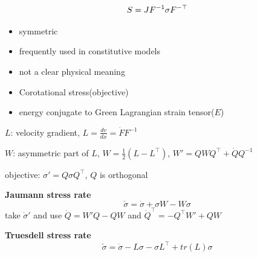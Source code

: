 \documentclass[landscape,a0paper,fontscale=0.285]{baposter} %
\newcommand{\compresslist}{ %
\setlength{\itemsep}{1pt}
\setlength{\parskip}{0pt}
\setlength{\parsep}{0pt}
}
\begin{document}
\begin{poster}
{\colorbox[HTML]{CCFFFF}{}\vspace{-0.3cm}
$$\vspace{-0.3cm}
S = JF^{-1}\sigma F^{-\top} 
$$

\begin{itemize} \compresslist
    \item symmetric
    \item frequently used in
constitutive models
    \item not a clear physical meaning
    \item Corotational stress(objective)
    \item energy conjugate to Green
Lagrangian strain tensor($E$)
\end{itemize}


\colorbox[HTML]{CCFFFF}{}

$L$: velocity gradient, $L=\frac{dv}{dx}=\dot FF^{-1}$

$W$: asymmetric part of $L$, $W = \frac{1}{2}(L- L^\top)$, $W'=QWQ^\top+\dot QQ^{-1}$

objective: $\sigma' = Q\sigma Q^\top$, $Q$ is orthogonal

\textbf{Jaumann stress rate}\vspace{-0.3cm}
$$
\check \sigma = \dot \sigma + \sigma W - W\sigma
$$
take $\dot \sigma'$ and use $\dot Q=W'Q-QW$ and $\dot Q^\top = -Q^\top W' + QW$

\textbf{Truesdell stress rate}\vspace{-0.3cm}
$$
\check \sigma = \dot \sigma - L\sigma - \sigma L^\top + tr(L)\sigma
$$
}



\end{poster}
\end{document}
